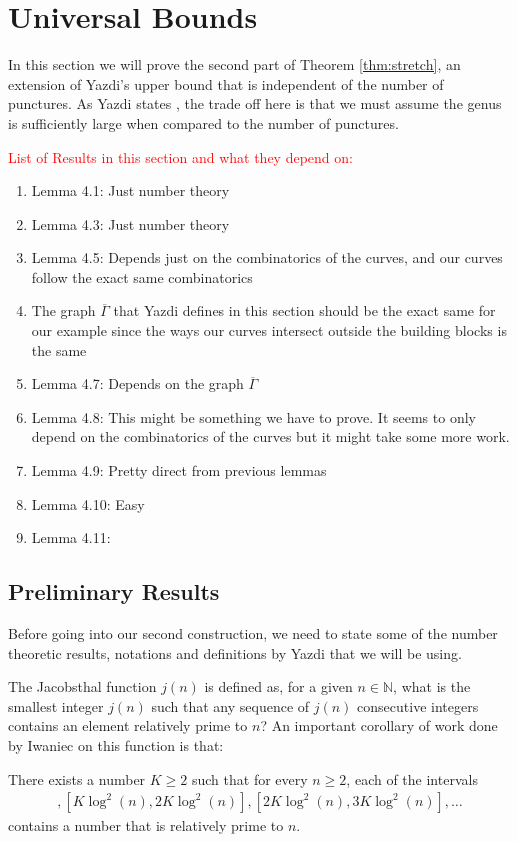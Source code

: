 \section{Universal Bounds}

In this section we will prove the second part of Theorem \ref{thm:stretch}, an extension of Yazdi's upper bound that is independent of the number of punctures. As Yazdi states , the trade off here is that we must assume the genus is sufficiently large when compared to the number of punctures.

\textcolor{red}{List of Results in this section and what they depend on:} 
\begin{enumerate}
    \item Lemma 4.1: Just number theory
    \item Lemma 4.3: Just number theory
    \item Lemma 4.5: Depends just on the combinatorics of the curves, and our curves follow the exact same combinatorics
    \item The graph $\overline{\Gamma}$ that Yazdi defines in this section should be the exact same for our example since the ways our curves intersect outside the building blocks is the same
    \item Lemma 4.7: Depends on the graph $\overline{\Gamma}$
    \item Lemma 4.8: This might be something we have to prove. It seems to only depend on the combinatorics of the curves but it might take some more work.
    \item Lemma 4.9: Pretty direct from previous lemmas
    \item Lemma 4.10: Easy
    \item Lemma 4.11:
\end{enumerate}

\subsection{Preliminary Results}

Before going into our second construction, we need to state some of the number theoretic results, notations and definitions by Yazdi that we will be using.

The Jacobsthal function $j(n)$ is defined as, for a given $n \in \mathbb{N}$, what is the smallest integer $j(n)$ such that any sequence of $j(n)$ consecutive integers contains an element relatively prime to $n$? An important corollary of work done by Iwaniec \cite{iwaniec1978problem} on this function is that:
\begin{cor}
There exists a number $K \geq 2$ such that for every $n \geq 2$, each of the intervals
\begin{align*}
    [\log^2(n),K\log^2(n)], [K\log^2(n),2K\log^2(n)],[2K\log^2(n),3K\log^2(n)],\dots
\end{align*}
contains a number that is relatively prime to $n$.
\end{cor}

